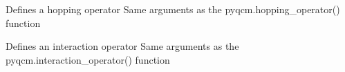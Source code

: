 \documentclass[letterpaper,10pt,english]{sphinxmanual}
\begin{document}
\begin{fulllineitems}
\begin{fulllineitems}
\begin{quote}
\begin{description}
\begin{itemize}
\end{itemize}

\end{description}\end{quote}

\end{fulllineitems}


\begin{fulllineitems}
\label{\detokenize{utilities:pyqcm.slab.slab.hopping_operator}}
\sphinxAtStartPar
Defines a hopping operator
Same arguments as the pyqcm.hopping\_operator() function

\end{fulllineitems}


\begin{fulllineitems}
\label{\detokenize{utilities:pyqcm.slab.slab.interaction_operator}}
\sphinxAtStartPar
Defines an interaction operator
Same arguments as the pyqcm.interaction\_operator() function

\end{fulllineitems}


\end{fulllineitems}
\end{document}
